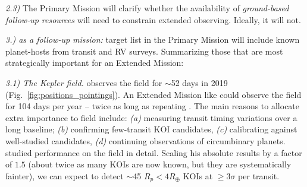 \textit{2.3)} 
The Primary Mission will clarify whether the availability of \textit{ground-based follow-up resources} will need to constrain \tesss extended observing.
Ideally, it will not.

\textit{3.) \tess as a follow-up mission:}
\tesss target list in the Primary Mission will include known planet-hosts from transit and RV surveys.
Summarizing those that are most strategically important for an Extended Mission:

\textit{3.1) The Kepler field.} \tess observes the \kepler field for $\sim$52 days in 2019 (Fig.~\ref{fig:positions_pointings}).
An Extended Mission like \npole\:could observe the field for 104 days per year -- twice as long as repeating \nhemi.
The main reasons to allocate extra importance to \keplers field include:
\textit{(a)} measuring transit timing variations over a long baseline;
\textit{(b)} confirming few-transit KOI candidates, 
\textit{(c)} calibrating \tess against well-studied candidates,
\textit{(d)} continuing observations of circumbinary planets.
\citet{sullivan_KOIs_2013} studied \tesss performance on the field in detail.
Scaling his absolute results by a factor of $1.5$ (about twice as many KOIs are now known, but they are systematically fainter), we can expect \tess to detect $\sim$45 $R_p<4R_\oplus$ KOIs at $\geq3\sigma$ per transit.

